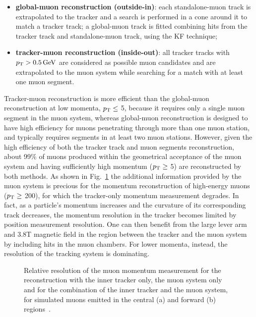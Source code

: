\begin{itemize}
\item {\bf global-muon reconstruction (outside-in)}: each standalone-muon track is extrapolated to the tracker and a search is performed in a cone around it to match a tracker track; a global-muon track is fitted combining hits from the tracker track and standalone-muon track, using the KF technique;
\item {\bf tracker-muon reconstruction (inside-out)}: all tracker tracks with $p_{\mathrm{T}} > 0.5\,\text{Ge\hspace{-.08em}V}$ are considered as possible muon candidates and are extrapolated to the muon system while searching for a match with at least one muon segment.
\end{itemize}

Tracker-muon reconstruction is more efficient than the global-muon reconstruction at low momenta, $p_{\mathrm{T}} \leq$ 5\GeV, because it requires only a single muon segment in the muon system, whereas global-muon reconstruction is designed to have high efficiency for muons penetrating through more than one muon station, and typically requires segments in at least two muon stations. However, given the high efficiency of both the tracker track and muon segments reconstruction, about 99\% of muons produced within the geometrical acceptance of the muon system and having sufficiently high momentum ($p_{\mathrm{T}} \geq$ 5\GeV) are reconstructed by both methods. As shown in Fig.~\ref{fig:mu_ptrel} the additional information provided by the muon system is precious for the momentum reconstruction of high-energy muons ($p_{\mathrm{T}} \geq$ 200\GeV), for which the tracker-only momentum measurement degrades. 
In fact, as a particle's momentum increases and the curvature of its corresponding track decreases, the momentum resolution in the tracker becomes limited by position measurement resolution. One can then benefit from the large lever arm and 3.8\unit{T} magnetic field in the region between the tracker and the muon system by including hits in the muon chambers. For lower momenta, instead, the resolution of the tracking system is dominating.

\begin{figure}[!htb]
\centering
{}\quad\quad\quad
{}
\caption{Relative resolution of the muon momentum measurement for the reconstruction with the inner tracker only, the muon system only and for the combination of the inner tracker and the muon system, for simulated muons emitted in the central (a) and forward (b) regions~\cite{Bayatian:922757}.}
\label{fig:mu_ptrel}
\end{figure}


